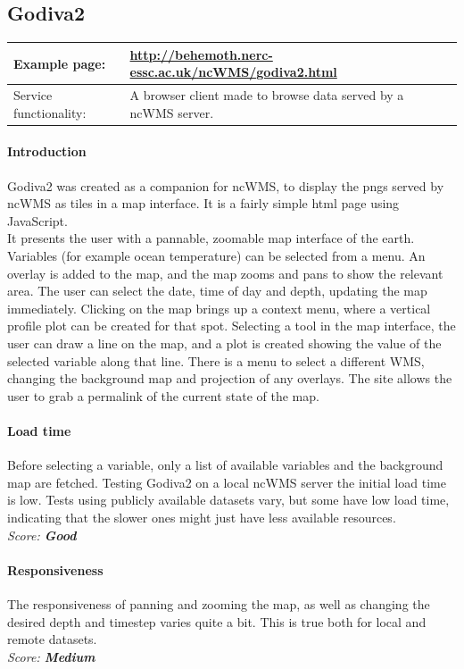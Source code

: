 \documentclass[11pt,a4paper,titlepage,oneside]{report}
\begin{document}
  \subsection{Godiva2}
     \begin{tabular}{|p{4cm}|p{8cm}|}
     \hline
     Example page: & \url{http://behemoth.nerc-essc.ac.uk/ncWMS/godiva2.html} \\
     \hline
     Service functionality: & A browser client made to browse data served by a ncWMS server. \\
     \hline
   \end{tabular}
   
  \paragraph{Introduction}
  Godiva2 was created as a companion for ncWMS, to display the pngs served by ncWMS as tiles in a map interface. It is a fairly simple html page using JavaScript. \\
   It presents the user with a pannable, zoomable map interface of the earth. Variables (for example ocean temperature) can be selected from a menu. An overlay is added to the map, and the map zooms and pans to show the relevant area. The user can select the date, time of day and depth, updating the map immediately. Clicking on the map brings up a context menu, where a vertical profile plot can be created for that spot. Selecting a tool in the map interface, the user can draw a line on the map, and a plot is created showing the value of the selected variable along that line. There is a menu to select a different WMS, changing the background map and projection of any overlays. The site allows the user to grab a permalink of the current state of the map.

	\paragraph{Load time}
	Before selecting a variable, only a list of available variables and the background map are fetched. Testing Godiva2 on a local ncWMS server the initial load time is low. Tests using publicly available datasets vary, but some have low load time, indicating that the slower ones might just have less available resources.
   \\ \emph{Score: \textbf{Good}}
	
	\paragraph{Responsiveness}
	The responsiveness of panning and zooming the map, as well as changing the desired depth and timestep varies quite a bit. This is true both for local and remote datasets.
   \\ \emph{Score: \textbf{Medium}}
	
\end{document}
